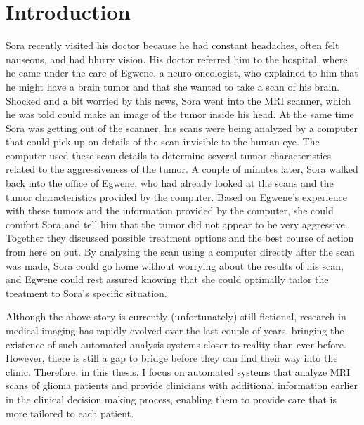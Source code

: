 
\chapter{Introduction}\label{chap:introduction}

\begin{ChapterAbstractNoTitle}
Sora recently visited his doctor because he had constant headaches, often felt nauseous, and had blurry vision.
His doctor referred him to the hospital, where he came under the care of Egwene, a neuro-oncologist, who explained to him that he might have a brain \gls{tumor} and that she wanted to take a scan of his brain.
Shocked and a bit worried by this news, Sora went into the MRI scanner, which he was told could make an image of the \gls{tumor} inside his head.
At the same time Sora was getting out of the scanner, his scans were being analyzed by a computer that could pick up on details of the scan invisible to the human eye.
The computer used these scan details to determine several \gls{tumor} characteristics related to the aggressiveness of the \gls{tumor}.
A couple of minutes later, Sora walked back into the office of Egwene, who had already looked at the scans and the \gls{tumor} characteristics provided by the computer.
Based on Egwene's experience with these \glspl{tumor} and the information provided by the computer, she could comfort Sora and tell him that the \gls{tumor} did not appear to be very aggressive.
Together they discussed possible treatment options and the best course of action from here on out.
By analyzing the scan using a computer directly after the scan was made, Sora could go home without worrying about the results of his scan, and Egwene could rest assured knowing that she could optimally tailor the treatment to Sora's specific situation.
\end{ChapterAbstractNoTitle}

Although the above story is currently (unfortunately) still fictional, research in medical imaging has rapidly evolved over the last couple of years, bringing the existence of such automated analysis systems closer to reality than ever before.
However, there is still a gap to bridge before they can find their way into the clinic.
Therefore, in this thesis, I focus on automated systems that analyze \acrshort{MRI} scans of glioma patients and provide clinicians with additional information earlier in the clinical decision making process, enabling them to provide care that is more tailored to each patient.

